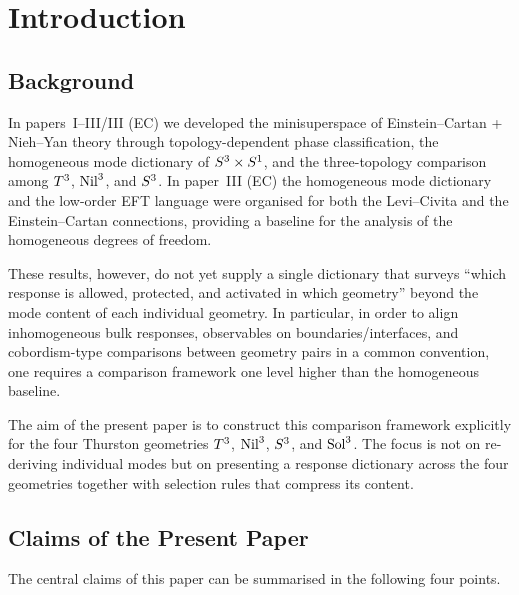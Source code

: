 \section{Introduction}
\label{sec:intro}

\subsection{Background}
\label{sec:intro:background}

In papers~I--III/III (EC) \cite{paper1,paper2,paper3,paper3ec} we developed the
minisuperspace of Einstein--Cartan + Nieh--Yan theory through
topology-dependent phase classification, the homogeneous mode dictionary of
$S^3\times S^1$, and the three-topology comparison among $T^3$,
$\mathrm{Nil}^3$, and $S^3$.  In paper~III (EC) \cite{paper3ec} the homogeneous
mode dictionary and the low-order EFT language were organised for both the
Levi--Civita and the Einstein--Cartan connections, providing a baseline for the
analysis of the homogeneous degrees of freedom.

These results, however, do not yet supply a single dictionary that surveys
``which response is allowed, protected, and activated in which geometry''
beyond the mode content of each individual geometry.  In particular, in order
to align inhomogeneous bulk responses, observables on boundaries/interfaces,
and cobordism-type comparisons between geometry pairs in a common convention,
one requires a comparison framework one level higher than the homogeneous
baseline.

The aim of the present paper is to construct this comparison framework
explicitly for the four Thurston \cite{Thurston1997} geometries $T^3$,
$\mathrm{Nil}^3$, $S^3$, and $\mathrm{Sol}^3$.  The focus is not on re-deriving
individual modes but on presenting a response dictionary across the four
geometries together with selection rules that compress its content.

\subsection{Claims of the Present Paper}
\label{sec:intro:claims}

The central claims of this paper can be summarised in the following four
points.

